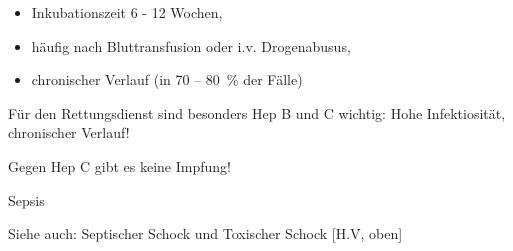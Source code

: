 \documentclass{article}
\begin{document}
\begin{itemize}
\item {\mdseries
Inkubationszeit 6 - 12 Wochen, }

\item {\mdseries
h\"aufig nach Bluttransfusion oder i.v. Drogenabusus, }

\item {\mdseries
chronischer Verlauf (in 70 -- 80~\% der F\"alle)}

\end{itemize}
{\mdseries
F\"ur den Rettungsdienst sind besonders Hep B und C wichtig: Hohe
Infektiosit\"at, chronischer Verlauf!}

{\mdseries
Gegen Hep C gibt es keine Impfung!}

{\mdseries\color[rgb]{0.0,0.0,0.5019608}
\label{bkm:RefHeading41252510}Sepsis}

{\mdseries
Siehe auch: Septischer Schock und Toxischer Schock
[H.V{\guillemotright}\pageref{bkm:RefHeading41284910}, oben]}
\end{document}
